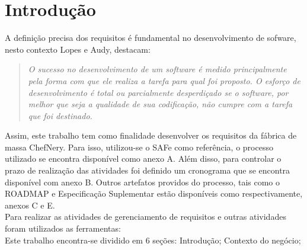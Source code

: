 
\chapter[Introdução]{Introdução}

A definição precisa dos requisitos é fundamental  no desenvolvimento de sofware, nesto contexto Lopes e  Audy, destacam:

\begin{quotation}
\textit{O sucesso no desenvolvimento de um software é medido principalmente pela forma com que ele realiza a tarefa para qual foi proposto. O esforço de desenvolvimento é total ou parcialmente desperdiçado se o software, por melhor que seja a qualidade de sua codificação, não cumpre com a tarefa que foi destinado.}
\end{quotation}

Assim, este trabalho tem como finalidade desenvolver os requisitos da fábrica de massa ChefNery. Para isso, utilizou-se o SAFe como referência, o processo utilizado se encontra disponível como anexo A.  Além disso, para controlar o prazo de realização das atividades foi definido um cronograma que se encontra disponível com anexo B. Outros artefatos providos do processo, tais como o ROADMAP e Especificação Suplementar estão disponíveis como respectivamente, anexos C e E. \\
\tab Para realizar as atividades de gerenciamento de requisitos e outras atividades foram utilizados as ferramentas: \\
\tab  Este trabalho encontra-se dividido em 6 seções: Introdução; Contexto do negócio; \\